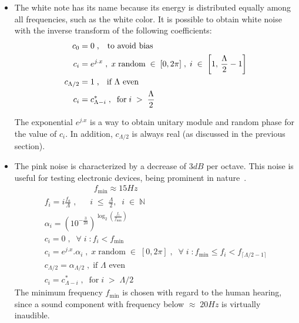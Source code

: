 \begin{itemize}
 \item The white note has its name because its energy is distributed equally among all frequencies, such as the white color. It is possible to obtain white noise with the inverse transform of the following coefficients:
\begin{equation}\label{eq:branco}
 \begin{split}
 c_0 & =0 \;\text{,\quad to avoid bias} \\
 c_i & =e^{j.x}\;,\; x \; \text{random} \; \in \; [0,2\pi]\;,\; i \; \in \; \left[1, \, \frac{\Lambda}{2}-1\right] \\
 c_{\Lambda/2} & = 1 \; \text{, \; if $\Lambda$ even}\\ 
 c_i & = c_{\Lambda - i}^*\;,\;\; \text{for}\;  i \; > \;  \frac{\Lambda}{2}
 \end{split}
\end{equation}

The exponential $e^{j.x}$ is a way to obtain unitary module and random phase for the value of $c_i$. In addition, $c_{\Lambda/2}$ is always real (as discussed in the previous section).

 \item The pink noise is characterized by a decrease of $3dB$ per octave. This noise is useful for testing electronic devices, being prominent in nature~\cite{Roederer}. 
\begin{multline}\label{eq:rosa}
 \qquad \qquad \qquad f_{\text{min}}  \approx 15 Hz \\
 f_i  = i \frac{f_a}{\Lambda} \;, \;\; \quad i \;\leq\; \frac{\Lambda}{2},\;\; i\;\in\;\mathbb{N}  \\
 \alpha_i  = \left(10^{-\frac{3}{20}}\right)^{\log _2 \left ( \frac{f_i}{f_{\text{min}}} \right )}  \\
 c_i  =0\;,\;\; \forall \; i \; : f_i<f_{\text{min}} \\
 c_i  =e^{j.x} . \alpha_i\;, \; x \; \text{random} \; \in \; [0,2\pi]\;,\;\; \forall \; i \; : f_{\text{min}} \le f_i < f_{\lceil \Lambda/2-1 \rceil}  \\
 c_{\Lambda/2}  = \alpha_{\Lambda/2}\;, \; \text{if $\Lambda$ even} \\ 
 c_i  = c_{\Lambda - i}^*\;,\;\; \text{for}\;  i \; > \;  \Lambda/2 \qquad \qquad
\end{multline}
The minimum frequency $f_{\text{min}}$ is chosen with regard to the human hearing, since a sound component with frequency below $\approx\; 20Hz$ is virtually inaudible.


\end{itemize}
